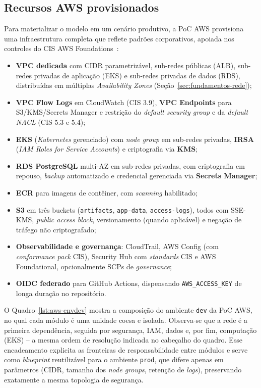\subsection{Recursos AWS provisionados}

Para materializar o modelo em um cenário produtivo, a PoC AWS provisiona uma infraestrutura completa que reflete padrões corporativos, apoiada nos controles do CIS AWS Foundations~:

\begin{itemize}
    \item \textbf{VPC dedicada} com CIDR parametrizável, sub-redes públicas (ALB), sub-redes privadas de aplicação (EKS) e sub-redes privadas de dados (RDS), distribuídas em múltiplas \textit{Availability Zones} (Seção~\ref{sec:fundamentos-rede});
    \item \textbf{VPC Flow Logs} em CloudWatch (CIS 3.9), \textbf{VPC Endpoints} para S3/KMS/Secrets Manager e restrição do \textit{default security group} e da \textit{default NACL} (CIS 5.3 e 5.4);
    \item \textbf{EKS} (\textit{Kubernetes} gerenciado) com \textit{node group} em sub-redes privadas, \textbf{IRSA} (\textit{IAM Roles for Service Accounts}) e criptografia via \textbf{KMS};
    \item \textbf{RDS PostgreSQL} multi-AZ em sub-redes privadas, com criptografia em repouso, \textit{backup} automatizado e credencial gerenciada via \textbf{Secrets Manager};
    \item \textbf{ECR} para imagens de contêiner, com \textit{scanning} habilitado;
    \item \textbf{S3} em três buckets (\texttt{artifacts}, \texttt{app-data}, \texttt{access-logs}), todos com SSE-KMS, \textit{public access block}, versionamento (quando aplicável) e negação de tráfego não criptografado;
    \item \textbf{Observabilidade e governança}: CloudTrail, AWS Config (com \textit{conformance pack} CIS), Security Hub com \textit{standards} CIS e AWS Foundational, opcionalmente SCPs de \textit{governance};
    \item \textbf{OIDC federado} para GitHub Actions, dispensando \texttt{AWS\_ACCESS\_KEY} de longa duração no repositório.
\end{itemize}

O Quadro~\ref{lst:aws-envdev} mostra a composição do ambiente \texttt{dev} da PoC AWS, no qual cada módulo é uma unidade coesa e isolada. Observa-se que a rede é a primeira dependência, seguida por segurança, IAM, dados e, por fim, computação (EKS) -- a mesma ordem de resolução indicada no cabeçalho do quadro. Esse encadeamento explicita as fronteiras de responsabilidade entre módulos e serve como \textit{blueprint} reutilizável para o ambiente \texttt{prod}, que difere apenas em parâmetros (CIDR, tamanho dos \textit{node groups}, retenção de \textit{logs}), preservando exatamente a mesma topologia de segurança.

